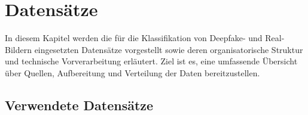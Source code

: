 \chapter{Datensätze}
\label{chap:datensaetze}

In diesem Kapitel werden die für die Klassifikation von Deepfake- und Real-Bildern eingesetzten Datensätze vorgestellt sowie deren organisatorische Struktur und technische Vorverarbeitung erläutert. Ziel ist es, eine umfassende Übersicht über Quellen, Aufbereitung und Verteilung der Daten bereitzustellen.

\section{Verwendete Datensätze}

